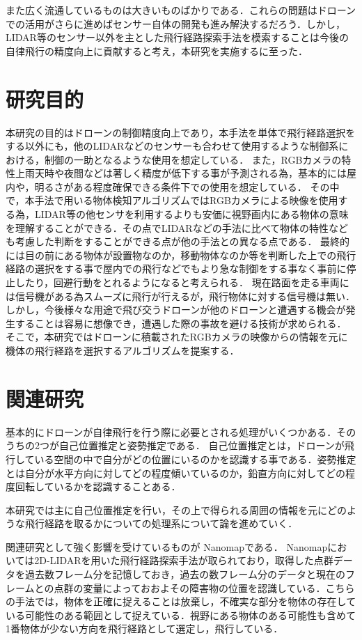 \documentclass[a4j,10pt]{jsarticle}
\begin{document}
また広く流通しているものは大きいものばかりである．これらの問題はドローンでの活用がさらに進めばセンサー自体の開発も進み解決するだろう．しかし，LIDAR等のセンサー以外を主とした飛行経路探索手法を模索することは今後の自律飛行の精度向上に貢献すると考え，本研究を実施するに至った．


\section{研究目的}
本研究の目的はドローンの制御精度向上であり，本手法を単体で飛行経路選択をする以外にも，他のLIDARなどのセンサーも合わせて使用するような制御系における，制御の一助となるような使用を想定している．
また，RGBカメラの特性上雨天時や夜間などは著しく精度が低下する事が予測される為，基本的には屋内や，明るさがある程度確保できる条件下での使用を想定している．
その中で，本手法で用いる物体検知アルゴリズムではRGBカメラによる映像を使用する為，LIDAR等の他センサを利用するよりも安価に視野画内にある物体の意味を理解することができる．その点でLIDARなどの手法に比べて物体の特性なども考慮した判断をすることができる点が他の手法との異なる点である．
最終的には目の前にある物体が設置物なのか，移動物体なのか等を判断した上での飛行経路の選択をする事で屋内での飛行などでもより急な制御をする事なく事前に停止したり，回避行動をとれるようになると考えられる．
現在路面を走る車両には信号機がある為スムーズに飛行が行えるが，飛行物体に対する信号機は無い．しかし，今後様々な用途で飛び交うドローンが他のドローンと遭遇する機会が発生することは容易に想像でき，遭遇した際の事故を避ける技術が求められる．
そこで，本研究ではドローンに積載されたRGBカメラの映像からの情報を元に機体の飛行経路を選択するアルゴリズムを提案する．

\section{関連研究}
基本的にドローンが自律飛行を行う際に必要とされる処理がいくつかある．そのうちの2つが自己位置推定と姿勢推定である．
自己位置推定とは，ドローンが飛行している空間の中で自分がどの位置にいるのかを認識する事である．姿勢推定とは自分が水平方向に対してどの程度傾いているのか，鉛直方向に対してどの程度回転しているかを認識することある．

本研究では主に自己位置推定を行い，その上で得られる周囲の情報を元にどのような飛行経路を取るかについての処理系について論を進めていく．

関連研究として強く影響を受けているものが Nanomap\cite{Nanomap}である．
Nanomapにおいては2D-LIDARを用いた飛行経路探索手法が取られており，取得した点群データを過去数フレーム分を記憶しておき，過去の数フレーム分のデータと現在のフレームとの点群の変量によっておおよその障害物の位置を認識している．こちらの手法では，物体を正確に捉えることは放棄し，不確実な部分を物体の存在している可能性のある範囲として捉えている．視野にある物体のある可能性も含めて1番物体が少ない方向を飛行経路として選定し，飛行している．
\end{document}
